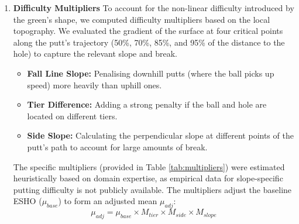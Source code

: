 \documentclass[11pt, letterpaper]{article}
\begin{document}
\begin{enumerate}
\item \textbf{Difficulty Multipliers}
To account for the non-linear difficulty introduced by the green's shape, we computed difficulty multipliers based on the local topography. We evaluated the gradient of the surface at four critical points along the putt's trajectory (50\%, 70\%, 85\%, and 95\% of the distance to the hole) to capture the relevant slope and break.

\begin{itemize}
    \item \textbf{Fall Line Slope:} Penalising downhill putts (where the ball picks up speed) more heavily than uphill ones.
    \item \textbf{Tier Difference:} Adding a strong penalty if the ball and hole are located on different tiers.
    \item \textbf{Side Slope:} Calculating the perpendicular slope at different points of the putt's path to account for large amounts of break.
\end{itemize}

The specific multipliers (provided in Table \ref{tab:multipliers}) were estimated heuristically based on domain expertise, as empirical data for slope-specific putting difficulty is not publicly available. The multipliers adjust the baseline ESHO ($\mu_{base}$) to form an adjusted mean $\mu_{adj}$:
\[ \mu_{adj} = \mu_{base} \times M_{tier} \times M_{side} \times M_{slope} \]


\end{enumerate}
\end{document}
